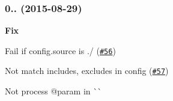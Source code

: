 \subsubsection*{0.. (2015-\/08-\/29)}


\begin{DoxyItemize}
\item {\bfseries Fix}
\begin{DoxyItemize}
\item Fail if config.\+source is {\ttfamily ./} (\href{https://github.com/esdoc/esdoc/issues/56}{\tt \#56})
\item Not match {\ttfamily includes, excludes} in config (\href{https://github.com/esdoc/esdoc/issues/57}{\tt \#57})
\item Not process {\ttfamily @param} in \`{}\`{} 
\end{DoxyItemize}
\end{DoxyItemize}